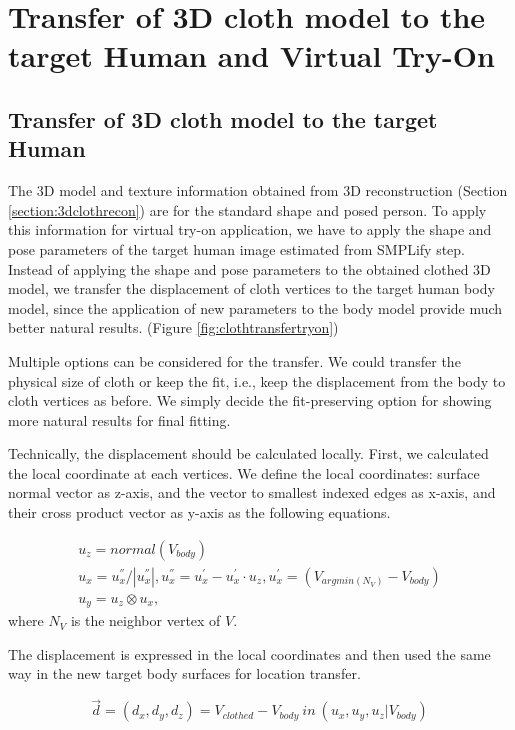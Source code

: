 \section{Transfer of 3D cloth model to the target Human and Virtual Try-On }  \label{section:clothtransfer}


\subsection{Transfer of 3D cloth model to the target Human} 

The 3D model and texture information obtained from 3D reconstruction (Section \ref{section:3dclothrecon}) are for the standard shape and posed person. To apply this information for virtual try-on application, we have to apply the shape and pose parameters of the target human image estimated from SMPLify\cite{Bogo2016SMPLify} step. Instead of applying the shape and pose parameters to the obtained clothed 3D model, we transfer the displacement of cloth vertices to the target human body model, since the application of new parameters to the body model provide much better natural results. (Figure \ref{fig:clothtransfertryon})


Multiple options can be considered for the transfer. We could transfer the physical size of cloth or keep the fit, i.e., keep the displacement from the body to cloth vertices as before.  We simply decide the fit-preserving option for showing more natural results for final fitting.  

Technically, the displacement should be calculated locally. First, we calculated the local coordinate at each vertices. We define the local coordinates: surface normal vector as z-axis, and the vector to smallest indexed edges as x-axis, and their cross product vector as y-axis as the following equations.


\begin{align}
 u_{z} =  normal(V_{body})  \\
 u_{x} = u^{''}_{x}/ |u^{''}_{x} |, 
 u^{''}_{x} = u^{'}_{x} - u^{'}_{x} \cdot u_{z}, 
 u^{'}_{x} = (V_{argmin(N_V) } - V_{body}) \\
 u_{y}  =  u_z \otimes u_x,
\end{align} 
 where $N_V$ is the neighbor vertex of $V$.
 

The displacement is expressed in the local coordinates and then used the same way in the new target body surfaces for location transfer.

\begin{equation}
\overrightarrow{d} = (d_x, d_y, d_z) = V_{clothed} - V_{body} \: in \: (u_x, u_y, u_z | V_{body})
\end{equation}


